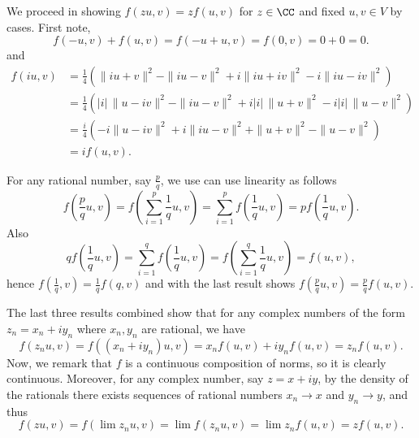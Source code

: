 \documentclass{homework}
\begin{document}
\begin{solution}
  We proceed in showing $f(zu,v) = zf(u,v)$ for $z\in\CC$ and fixed $u,v \in V$ by cases.  First note,
  $$
    f(-u,v) + f(u,v) = f(-u+u,v) = f(0,v) = 0 + 0 =0.
  $$
  and
  \begin{align*}
    f(iu,v) &= \frac{1}{4} \left(\|iu + v\|^2 - \|iu - v\|^2  + i\|iu + iv\|^2 - i\|iu - iv\|^2\right)\\
            &= \frac{1}{4} \left(|i|\,\|u - iv\|^2 - \|iu - v\|^2  + i|i|\,\|u + v\|^2 - i|i|\,\|u - v\|^2\right)\\
            &= \frac{i}{4} \left(-i\|u - iv\|^2 + i\|iu - v\|^2  + \|u + v\|^2 - \|u - v\|^2\right)\\
            &= if(u,v). 
  \end{align*}

  For any rational
  number, say $\frac pq$, we use can use linearity as follows
  $$
  f\left(\frac pq u,v\right) = f\left(\sum_{i=1}^p\frac 1q u,v \right) =  \sum_{i=1}^pf\left(\frac 1q u,v \right) = pf\left(\frac 1q u,v\right).
  $$
  Also
  $$ 
    q f\left(\frac 1q u,v\right) = \sum_{i=1}^qf\left(\frac 1q u,v\right) = f\left(\sum_{i=1}^q\frac 1q u,v\right) = f(u,v),
  $$
  hence $f\left(\frac 1q,v\right) = \frac 1q f(q,v)$ and with the last result shows $f\left(\frac pq u,v\right) = \frac pq f(u,v)$.

  The last three results combined show that for any complex numbers of the form $z_n = x_n + iy_n$ where $x_n,y_n$ are rational, we have
  $$
  f(z_n u,v) = f((x_n + iy_n)u,v) = x_n f(u,v) + iy_n f(u,v) = z_n f(u,v).
  $$
  Now, we remark that $f$ is a continuous composition of norms, so it is clearly continuous. Moreover, for any complex number, say $z = x + iy$, by the density of the rationals there exists sequences of rational numbers $x_n \to x$ and $y_n \to y$, and thus 
  $$
    f(z u, v) = f( \lim z_n u, v) = \lim f( z_n u,v) = \lim z_n f(u,v) = z f(u,v).
  $$
  


\end{solution}
\end{document}
